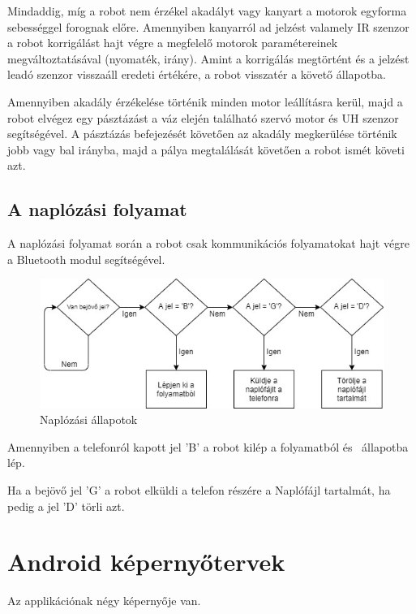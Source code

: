 \documentclass[]{thesis-ekf}
\theoremstyle{definition}
\begin{document}
Mindaddig, míg a robot nem érzékel akadályt vagy kanyart a motorok egyforma sebességgel forognak előre. Amennyiben kanyarról ad jelzést valamely IR szenzor a robot korrigálást hajt végre a megfelelő motorok paramétereinek megváltoztatásával (nyomaték, irány). Amint a korrigálás megtörtént és a jelzést leadó szenzor visszaáll eredeti értékére, a robot visszatér a követő állapotba.

Amennyiben akadály érzékelése történik minden motor leállításra kerül, majd a robot elvégez egy pásztázást a váz elején található szervó motor és UH szenzor segítségével. A pásztázás befejezését követően az akadály megkerülése történik jobb vagy bal irányba, majd a pálya megtalálását követően a robot ismét követi azt.
\subsection{A naplózási folyamat}\label{naplokepernyo_allapot}
A naplózási folyamat során a robot csak kommunikációs folyamatokat hajt végre a Bluetooth modul segítségével.\begin{figure}[h]
	\centering
	\includegraphics[width=\columnwidth]{images/grafok/log_graf}
	\caption{Naplózási állapotok}
	\label{log_graf}
\end{figure}

Amennyiben a telefonról kapott jel 'B' a robot kilép a folyamatból és \az{\ref{start_allapot}}~állapotba lép.

Ha a bejövő jel 'G' a robot elküldi a telefon részére a Naplófájl tartalmát, ha pedig a jel 'D' törli azt.
\section{Android képernyőtervek}
Az applikációnak négy képernyője van.
\end{document}
